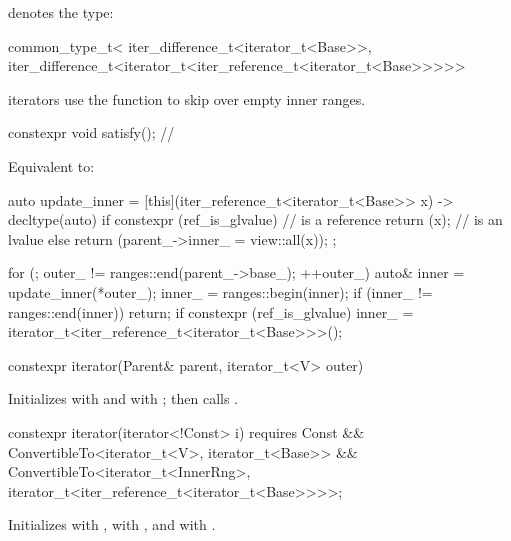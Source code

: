 \pnum
{} denotes the type:
\begin{codeblock}
common_type_t<
  iter_difference_t<iterator_t<Base>>,
  iter_difference_t<iterator_t<iter_reference_t<iterator_t<Base>>>>>
\end{codeblock}

\pnum
{} iterators use the  function to skip over
empty inner ranges.

\begin{itemdecl}
constexpr void satisfy();       // \expos
\end{itemdecl}

\begin{itemdescr}
\pnum
\effects Equivalent to:
\begin{codeblock}
auto update_inner = [this](iter_reference_t<iterator_t<Base>> x) -> decltype(auto) {
  if constexpr (ref_is_glvalue) //  is a reference
    return (x);                 //  is an lvalue
  else
    return (parent_->inner_ = view::all(x));
};

for (; outer_ != ranges::end(parent_->base_); ++outer_) {
  auto& inner = update_inner(*outer_);
  inner_ = ranges::begin(inner);
  if (inner_ != ranges::end(inner))
    return;
}
if constexpr (ref_is_glvalue)
  inner_ = iterator_t<iter_reference_t<iterator_t<Base>>>();
\end{codeblock}
\end{itemdescr}

\begin{itemdecl}
constexpr iterator(Parent& parent, iterator_t<V> outer)
\end{itemdecl}

\begin{itemdescr}
\pnum
\effects Initializes  with  and
 with ; then calls .
\end{itemdescr}

\begin{itemdecl}
constexpr iterator(iterator<!Const> i)
  requires Const &&
           ConvertibleTo<iterator_t<V>, iterator_t<Base>> &&
           ConvertibleTo<iterator_t<InnerRng>,
                         iterator_t<iter_reference_t<iterator_t<Base>>>>;
\end{itemdecl}

\begin{itemdescr}
\pnum
\effects Initializes  with ,
 with , and
 with .
\end{itemdescr}

